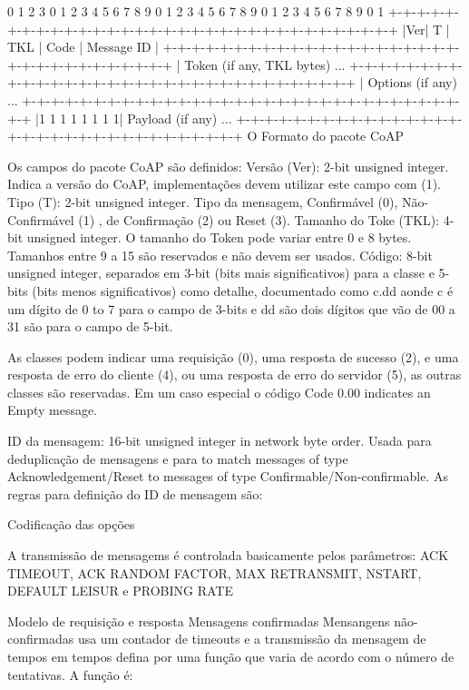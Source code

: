      0                   1                   2                   3
    0 1 2 3 4 5 6 7 8 9 0 1 2 3 4 5 6 7 8 9 0 1 2 3 4 5 6 7 8 9 0 1
   +-+-+-+-+-+-+-+-+-+-+-+-+-+-+-+-+-+-+-+-+-+-+-+-+-+-+-+-+-+-+-+-+
   |Ver| T |  TKL  |      Code     |          Message ID           |
   +-+-+-+-+-+-+-+-+-+-+-+-+-+-+-+-+-+-+-+-+-+-+-+-+-+-+-+-+-+-+-+-+
   |   Token (if any, TKL bytes) ...
   +-+-+-+-+-+-+-+-+-+-+-+-+-+-+-+-+-+-+-+-+-+-+-+-+-+-+-+-+-+-+-+-+
   |   Options (if any) ...
   +-+-+-+-+-+-+-+-+-+-+-+-+-+-+-+-+-+-+-+-+-+-+-+-+-+-+-+-+-+-+-+-+
   |1 1 1 1 1 1 1 1|    Payload (if any) ...
   +-+-+-+-+-+-+-+-+-+-+-+-+-+-+-+-+-+-+-+-+-+-+-+-+-+-+-+-+-+-+-+-+
   O Formato do pacote CoAP  \cite{draft-ietf-core-coap-18}


Os campos do pacote CoAP são definidos:
   Versão (Ver):  2-bit unsigned integer.  Indica a versão do CoAP, implementações devem utilizar este campo com (1).
   Tipo (T):  2-bit unsigned integer. Tipo da mensagem, Confirmável (0), Não-Confirmável (1) , de Confirmação (2) ou Reset (3).
   Tamanho do Toke (TKL):  4-bit unsigned integer. O tamanho do Token pode variar entre 0 e 8 bytes. Tamanhos entre 9 a 15 são reservados e não devem ser usados.
   Código:  8-bit unsigned integer, separados em 3-bit (bits mais significativos) para a classe e 5-bits (bits menos significativos) como detalhe, documentado como c.dd aonde c é um dígito de 0 to 7 para o campo de 3-bits e dd são dois dígitos que vão de 00 a 31 são para o campo de 5-bit.
   
   As classes podem indicar uma requisição (0), uma resposta de sucesso (2), e uma resposta de erro do cliente (4), ou uma resposta de erro do servidor (5), as outras classes são reservadas. Em um caso especial o código Code 0.00 indicates an Empty message.

   ID da mensagem:  16-bit unsigned integer in network byte order. Usada para deduplicação de mensagens e para to match messages of type Acknowledgement/Reset to messages of type Confirmable/Non-confirmable.
   As regras para definição do ID de mensagem são:
   
Codificação das opções


A transmissão de mensagems é controlada basicamente pelos parâmetros: ACK TIMEOUT, ACK RANDOM FACTOR, MAX RETRANSMIT, NSTART, DEFAULT LEISUR e PROBING RATE


Modelo de requisição e resposta Mensagens confirmadas Mensangens não-confirmadas usa um contador de timeouts e a transmissão da mensagem de tempos em tempos defina por uma função que varia de acordo com o número de tentativas.
A função é:

